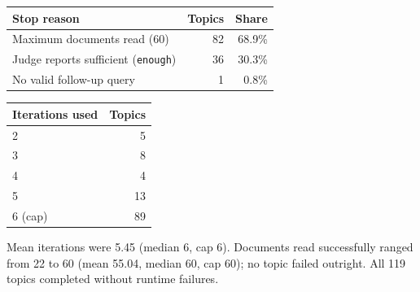 \begin{center}
\label{tab:trace-topology}
\centering
\small
\begin{tabular}{@{}lrr@{}}
\toprule
Stop reason & Topics & Share \\
\midrule
Maximum documents read (60) & 82 & 68.9\% \\
Judge reports sufficient (\texttt{enough}) & 36 & 30.3\% \\
No valid follow-up query & 1 & 0.8\% \\
\bottomrule
\end{tabular}

\smallskip

\begin{tabular}{@{}lr@{}}
\toprule
Iterations used & Topics \\
\midrule
2 & 5 \\
3 & 8 \\
4 & 4 \\
5 & 13 \\
6 (cap) & 89 \\
\bottomrule
\end{tabular}
\end{center}

Mean iterations were 5.45 (median 6, cap 6). Documents read
successfully ranged from 22 to 60 (mean 55.04, median 60, cap 60); no
topic failed outright. All 119 topics completed without runtime failures.
